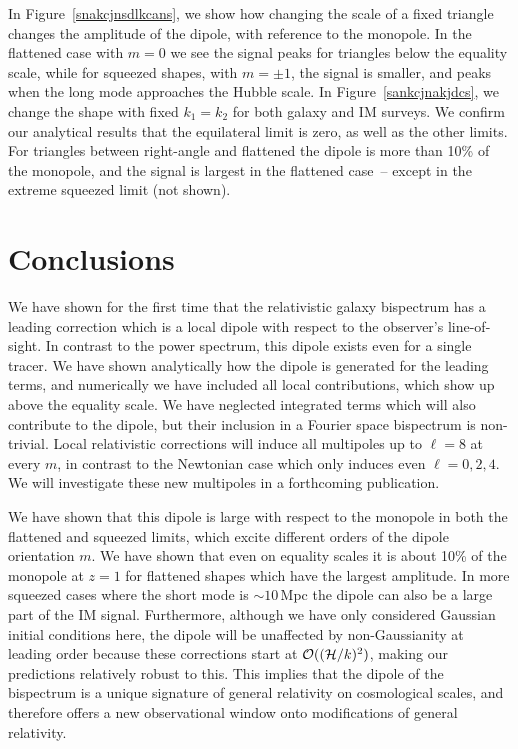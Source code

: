 In Figure~\ref{snakcjnsdlkcans}, we show how changing the scale of a fixed triangle changes the amplitude of the dipole, with reference to the monopole. In the flattened case with $m=0$ we see the signal peaks for triangles below the equality scale, while for squeezed shapes, with $m=\pm1$, the signal is smaller, and peaks when the long mode approaches the Hubble scale. 
In Figure~\ref{sankcjnakjdcs}, we change the shape with fixed $k_1=k_2$ for both galaxy and IM surveys. We confirm our analytical results that the equilateral limit is zero, as well as the other limits. For triangles between right-angle and flattened the dipole is more than 10\% of the monopole, and the signal is largest in the flattened case~-- except in the extreme squeezed limit (not shown). 

\section{Conclusions}

We have shown for the first time that the relativistic galaxy bispectrum has a leading correction which is a local dipole with respect to the observer's line-of-sight. In contrast to the power spectrum, this dipole exists even for a single tracer. We have shown analytically how the dipole is generated for the leading terms, and numerically we have included all local contributions, which show up above the equality scale. We have neglected integrated terms which will also contribute to the dipole, but their inclusion in a Fourier space bispectrum is non-trivial. Local relativistic corrections will induce all multipoles up to $\ell=8$ at every $m$, in contrast to the Newtonian case which only induces even $\ell=0,2,4$. We will investigate these new multipoles in a forthcoming publication. 

We have shown that this dipole is large with respect to the monopole in both the flattened and squeezed limits, which excite different orders of the dipole orientation $m$.  We have shown that even on equality scales it is about 10\% of the monopole at $z=1$ for flattened shapes which have the largest amplitude. In more squeezed cases where the short mode is $\sim10$\,Mpc the dipole can also be a large part of the IM signal. Furthermore, although we have only considered Gaussian initial conditions here, the dipole will be unaffected by non-Gaussianity at leading order because these corrections start at $\mathcal{O}((\mathcal{H}/k)^2)$, making our predictions relatively robust to this. This implies that the dipole of the bispectrum is a unique signature of general relativity on cosmological scales, and therefore offers a new observational window onto modifications of general relativity. 





